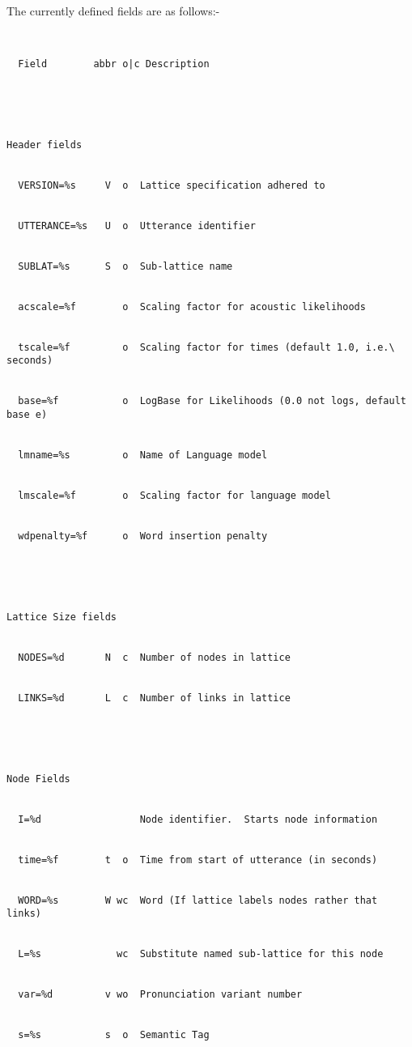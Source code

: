 




The currently defined fields are as follows:-





\begin{verbatim}


  Field        abbr o|c Description





Header fields


  VERSION=%s     V  o  Lattice specification adhered to


  UTTERANCE=%s   U  o  Utterance identifier


  SUBLAT=%s      S  o  Sub-lattice name


  acscale=%f        o  Scaling factor for acoustic likelihoods


  tscale=%f         o  Scaling factor for times (default 1.0, i.e.\ seconds)


  base=%f           o  LogBase for Likelihoods (0.0 not logs, default base e)


  lmname=%s         o  Name of Language model


  lmscale=%f        o  Scaling factor for language model


  wdpenalty=%f      o  Word insertion penalty





Lattice Size fields


  NODES=%d       N  c  Number of nodes in lattice


  LINKS=%d       L  c  Number of links in lattice





Node Fields


  I=%d                 Node identifier.  Starts node information


  time=%f        t  o  Time from start of utterance (in seconds)


  WORD=%s        W wc  Word (If lattice labels nodes rather that links)


  L=%s             wc  Substitute named sub-lattice for this node


  var=%d         v wo  Pronunciation variant number


  s=%s           s  o  Semantic Tag






\end{verbatim}
